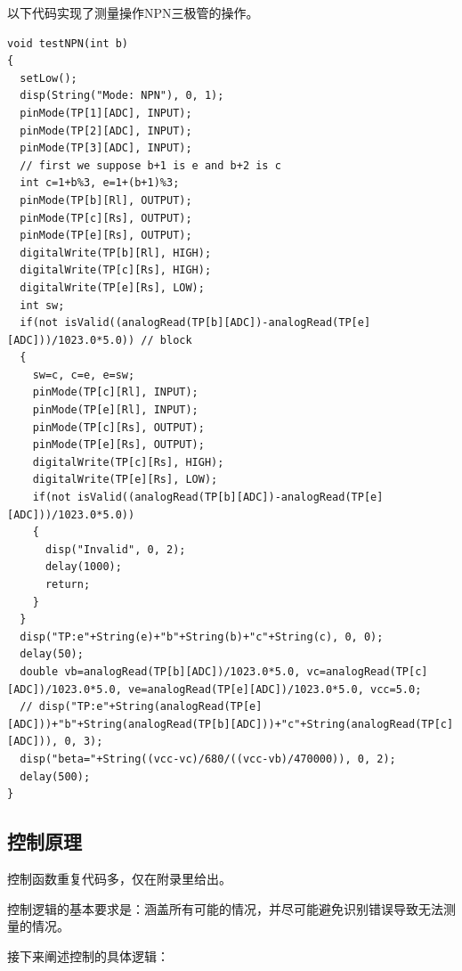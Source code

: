 \documentclass[a4paper]{article}
\begin{document}
	以下代码实现了测量操作NPN三极管的操作。
\begin{lstlisting}
void testNPN(int b)
{
  setLow();
  disp(String("Mode: NPN"), 0, 1);
  pinMode(TP[1][ADC], INPUT);
  pinMode(TP[2][ADC], INPUT);
  pinMode(TP[3][ADC], INPUT);
  // first we suppose b+1 is e and b+2 is c
  int c=1+b%3, e=1+(b+1)%3;
  pinMode(TP[b][Rl], OUTPUT);
  pinMode(TP[c][Rs], OUTPUT);
  pinMode(TP[e][Rs], OUTPUT);
  digitalWrite(TP[b][Rl], HIGH);
  digitalWrite(TP[c][Rs], HIGH);
  digitalWrite(TP[e][Rs], LOW);
  int sw;
  if(not isValid((analogRead(TP[b][ADC])-analogRead(TP[e][ADC]))/1023.0*5.0)) // block
  {
    sw=c, c=e, e=sw;
    pinMode(TP[c][Rl], INPUT);
    pinMode(TP[e][Rl], INPUT);
    pinMode(TP[c][Rs], OUTPUT);
    pinMode(TP[e][Rs], OUTPUT);
    digitalWrite(TP[c][Rs], HIGH);
    digitalWrite(TP[e][Rs], LOW);
    if(not isValid((analogRead(TP[b][ADC])-analogRead(TP[e][ADC]))/1023.0*5.0))
    {
      disp("Invalid", 0, 2);
      delay(1000);
      return;
    }
  }
  disp("TP:e"+String(e)+"b"+String(b)+"c"+String(c), 0, 0);
  delay(50);
  double vb=analogRead(TP[b][ADC])/1023.0*5.0, vc=analogRead(TP[c][ADC])/1023.0*5.0, ve=analogRead(TP[e][ADC])/1023.0*5.0, vcc=5.0;
  // disp("TP:e"+String(analogRead(TP[e][ADC]))+"b"+String(analogRead(TP[b][ADC]))+"c"+String(analogRead(TP[c][ADC])), 0, 3);
  disp("beta="+String((vcc-vc)/680/((vcc-vb)/470000)), 0, 2);
  delay(500);
}
\end{lstlisting}
	
	\subsection{控制原理}
		控制函数重复代码多，仅在附录里给出。
		
		控制逻辑的基本要求是：涵盖所有可能的情况，并尽可能避免识别错误导致无法测量的情况。
		
		接下来阐述控制的具体逻辑：
		
\end{document}
